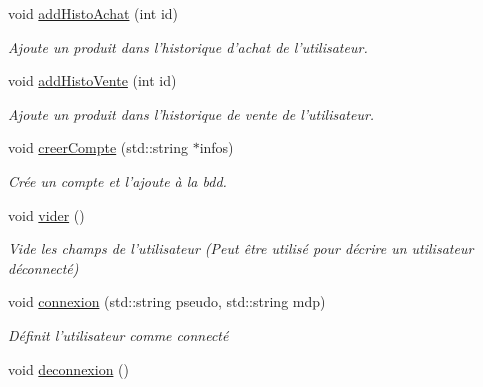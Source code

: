 \begin{DoxyCompactItemize}
\item 
void \hyperlink{classUtilisateur_a5e2d22fa977ec78efaeff34ba404878c}{add\-Histo\-Achat} (int id)
\begin{DoxyCompactList}\small\item\em Ajoute un produit dans l'historique d'achat de l'utilisateur. \end{DoxyCompactList}\item 
void \hyperlink{classUtilisateur_a23adc8461a76f9816dac9f87f2adb135}{add\-Histo\-Vente} (int id)
\begin{DoxyCompactList}\small\item\em Ajoute un produit dans l'historique de vente de l'utilisateur. \end{DoxyCompactList}\item 
void \hyperlink{classUtilisateur_ac586ef4afa8c85f56cca3c688732bb81}{creer\-Compte} (std\-::string $\ast$infos)
\begin{DoxyCompactList}\small\item\em Crée un compte et l'ajoute à la bdd. \end{DoxyCompactList}\item 
\hypertarget{classUtilisateur_ac10b85517b5b34b1357744a495537165}{void \hyperlink{classUtilisateur_ac10b85517b5b34b1357744a495537165}{vider} ()}\label{classUtilisateur_ac10b85517b5b34b1357744a495537165}

\begin{DoxyCompactList}\small\item\em Vide les champs de l'utilisateur (Peut être utilisé pour décrire un utilisateur déconnecté) \end{DoxyCompactList}\item 
void \hyperlink{classUtilisateur_a41b0d5ff30d82c9f68110fb6687f449a}{connexion} (std\-::string pseudo, std\-::string mdp)
\begin{DoxyCompactList}\small\item\em Définit l'utilisateur comme connecté \end{DoxyCompactList}\item 
\hypertarget{classUtilisateur_aed5a9ebdb82025692fa06622d9239cf7}{void \hyperlink{classUtilisateur_aed5a9ebdb82025692fa06622d9239cf7}{deconnexion} ()}\label{classUtilisateur_aed5a9ebdb82025692fa06622d9239cf7}


\end{DoxyCompactItemize}
